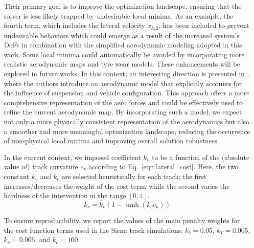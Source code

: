 Their primary goal is to improve the optimization landscape, ensuring that the solver is less likely trapped by undesirable local minima. As an example, the fourth term, which includes the lateral velocity $x_{k,2}$, has been included to prevent undesirable behaviors which could emerge as a result of the increased system's DoFs in combination with the simplified aerodynamic modeling adopted in this work. Some local minima could automatically be avoided by incorporating more realistic aerodynamic maps and tyre wear models. These enhancements will be explored in future works. In this context, an interesting direction is presented in~\cite{Masouleh:IEEE:2016}, where the authors introduce an aerodynamic model that explicitly accounts for the influence of suspension and vehicle configuration. This approach offers a more comprehensive representation of the aero forces and could be effectively used to refine the current aerodynamic map. By incorporating such a model, we expect not only a more physically consistent representation of the aerodynamics but also a smoother and more meaningful optimization landscape, reducing the occurrence of non-physical local minima and improving overall solution robustness.%

In the current context, we imposed coefficient $k_v$ to be a function of the (absolute value of) track curvature $c_k$ according to Eq.~\eqref{eqn:lateral_cost}. Here, the two constant $\bar{k}_v$ and $k_c$ are selected heuristically for each track; the first increases/decreases the weight of the cost term, while the second varies the hardness of the intervention in the range $[0,1]$.
\begin{equation}\label{eqn:lateral_cost}
	k_v = \bar{k}_v(1-\tanh(k_c c_k))
\end{equation}

To ensure reproducibility, we report the values of the main penalty weights for the cost function terms used in the Siena track simulations: $k_{\delta} = 0.05$, $k_T = 0.005$, $\bar{k}_v = 0.005$, and $k_c = 100$. 